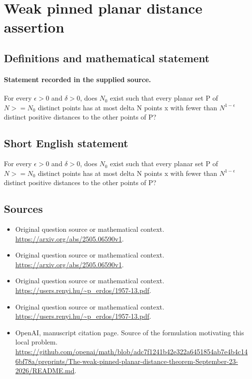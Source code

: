 \documentclass[11pt]{article}
\begin{document}
\section*{Weak pinned planar distance assertion}\label{30007108}
\subsection{Definitions and mathematical statement}
\paragraph{Statement recorded in the supplied source.}
For every $\epsilon >0$ and $\delta >0$, does $N_0$ exist such that every planar set P of $N>=N_0$ distinct points has at most delta N points x with fewer than $N^{1-\epsilon }$ distinct positive distances to the other points of P?
\subsection{Short English statement}
For every $\epsilon >0$ and $\delta >0$, does $N_0$ exist such that every planar set P of $N>=N_0$ distinct points has at most delta N points x with fewer than $N^{1-\epsilon }$ distinct positive distances to the other points of P?
\subsection{Sources}
\begin{itemize}
\item[S1] Original question source or mathematical context.
\url{https://arxiv.org/abs/2505.06590v1}.
\item[S2] Original question source or mathematical context.
\url{https://arxiv.org/abs/2505.06590v1}.
\item[S3] Original question source or mathematical context.
\url{https://users.renyi.hu/~p_erdos/1957-13.pdf}.
\item[S4] Original question source or mathematical context.
\url{https://users.renyi.hu/~p_erdos/1957-13.pdf}.
\item[S5] OpenAI, manuscript citation page. Source of the formulation motivating this local problem.
\url{https://github.com/openai/math/blob/adc7f1241b42e322a6451854ab7e4b4c146bf78a/preprints/The-weak-pinned-planar-distance-theorem-September-23-2026/README.md}.
\end{itemize}
\end{document}
